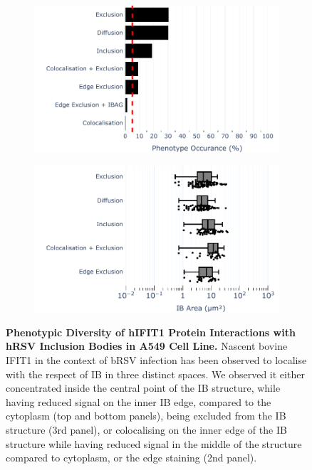 \begin{figure}
    \begin{subfigure}{0.495\textwidth}
        \caption{}
        \includegraphics[width=1\linewidth]{09. Chapter 4/Figs/02. Infection/01. IFIT1/01. bar_i1_a549.pdf} 
    \end{subfigure}
    \begin{subfigure}{0.495\textwidth}
        \caption{}
        \includegraphics[width=1\linewidth]{09. Chapter 4/Figs/02. Infection/01. IFIT1/02. box_i1_a549.pdf}
    \end{subfigure}
    \caption[Phenotypic Diversity of hIFIT1 Protein Interactions with hRSV Inclusion Bodies in A549 Cell Line.]{\textbf{Phenotypic Diversity of hIFIT1 Protein Interactions with hRSV Inclusion Bodies in A549 Cell Line.} Nascent bovine IFIT1 in the context of bRSV infection has been observed to localise with the respect of IB in three distinct spaces. We observed it either concentrated inside the central point of the IB structure, while having reduced signal on the inner IB edge, compared to the cytoplasm (top and bottom panels), being excluded from the IB structure (3rd panel), or colocalising on the inner edge of the IB structure while having reduced signal in the middle of the structure compared to cytoplasm, or the edge staining (2nd panel).}
    \label{fig:Phenotypic Diversity of hIFIT1 Protein Interactions with hRSV Inclusion Bodies in A549 Cell Line}
\end{figure}

